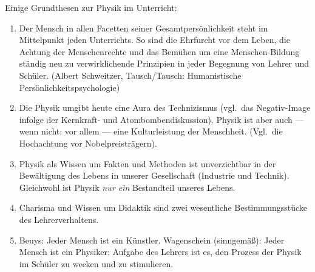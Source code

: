 Einige Grundthesen zur Physik im Unterricht:

\begin{enumerate}
	\item Der Mensch in allen Facetten seiner Gesamtpers\"{o}nlichkeit steht im Mittelpunkt jeden Unterrichts. So sind die Ehrfurcht vor dem Leben, die Achtung der Menschenrechte und das Bem\"{u}hen um eine Menschen-Bildung st\"{a}ndig neu zu verwirklichende Prinzipien in jeder Begegnung von Lehrer und Sch\"{u}ler. (Albert Schweitzer, Tausch/Tausch: Humanistische Pers\"{o}nlichkeitspsychologie)
	\item Die Physik umgibt heute eine Aura des Technizismus (vgl.\ das Negativ-Image infolge der Kernkraft- und Atombombendiskussion). Physik ist aber auch --- wenn nicht: vor allem --- eine Kulturleistung der Menschheit. (Vgl.\ die Hochachtung vor Nobelpreistr\"{a}gern).
	\item Physik als Wissen um Fakten und Methoden ist unverzichtbar in der Bew\"{a}ltigung des Lebens in unserer Gesellschaft (Industrie und Technik). Gleichwohl ist Physik \emph{nur ein} Bestandteil unseres Lebens.
	\item Charisma und Wissen um Didaktik sind zwei wesentliche Bestimmungsst\"{u}cke des Lehrerverhaltens.
	\item Beuys: Jeder Mensch ist ein K\"{u}nstler. Wagenschein (sinngem\"{a}{\ss}): Jeder Mensch ist ein Physiker: Aufgabe des Lehrers ist es, den Prozess der Physik im Sch\"{u}ler zu wecken und zu stimulieren.
\end{enumerate}
